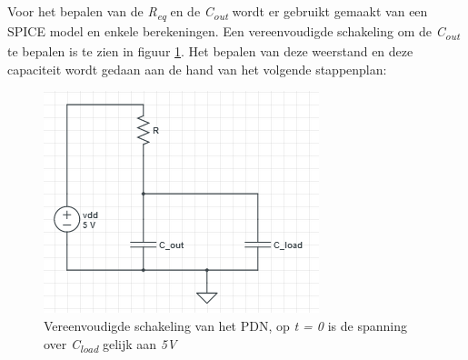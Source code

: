\documentclass{article}
\begin{document}
\newcommand{\tss}{\textsubscript}
\newcommand{\tsss}{\textsuperscript}

Voor het bepalen van de \emph{R\tss{eq}} en de \emph{C\tss{out}} wordt er gebruikt gemaakt van een SPICE model en enkele berekeningen. Een vereenvoudigde schakeling om de \emph{C\tss{out}} te bepalen is te zien in figuur \ref{res:PDN_schematic}. Het bepalen van deze weerstand en deze capaciteit wordt gedaan aan de hand van het volgende stappenplan:

 \begin{figure} [h!]
 \begin{center}
 \includegraphics [scale = 0.5] {../figures/PDN_schematic}
 \caption{Vereenvoudigde schakeling van het PDN, op \emph{t = 0} is de spanning over \emph{C\tss{load}} gelijk aan \emph{5V}}
 \label{res:PDN_schematic}
 \end{center}
 \end{figure}
\end{document}
